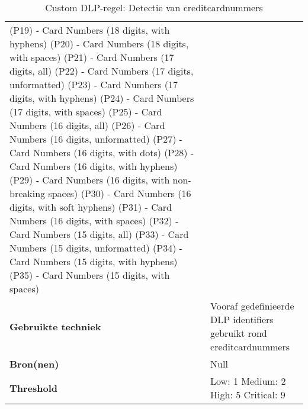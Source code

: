 \begin{table}[h]
\begin{tabular}{p{4cm} p{10cm}}
        (P19) - Card Numbers (18 digits, with hyphens) \newline
        (P20) - Card Numbers (18 digits, with spaces) \newline
        (P21) - Card Numbers (17 digits, all) \newline
        (P22) - Card Numbers (17 digits, unformatted) \newline
        (P23) - Card Numbers (17 digits, with hyphens) \newline
        (P24) - Card Numbers (17 digits, with spaces) \newline
        (P25) - Card Numbers (16 digits, all) \newline
        (P26) - Card Numbers (16 digits, unformatted) \newline
        (P27) - Card Numbers (16 digits, with dots) \newline
        (P28) - Card Numbers (16 digits, with hyphens) \newline
        (P29) - Card Numbers (16 digits, with non-breaking spaces) \newline
        (P30) - Card Numbers (16 digits, with soft hyphens) \newline
        (P31) - Card Numbers (16 digits, with spaces) \newline
        (P32) - Card Numbers (15 digits, all) \newline
        (P33) - Card Numbers (15 digits, unformatted) \newline
        (P34) - Card Numbers (15 digits, with hyphens) \newline
        (P35) - Card Numbers (15 digits, with spaces) \\
        \textbf{Gebruikte techniek} & Vooraf gedefinieerde DLP identifiers gebruikt rond creditcardnummers \\
        \textbf{Bron(nen)} & Null \\
        \textbf{Threshold} & Low: 1 \quad Medium: 2 \quad High: 5 \quad Critical: 9 \\
        \bottomrule
    \end{tabular}
    \caption{Custom DLP-regel: Detectie van creditcardnummers}
    \label{tab:custom-eu-card}
\end{table}


